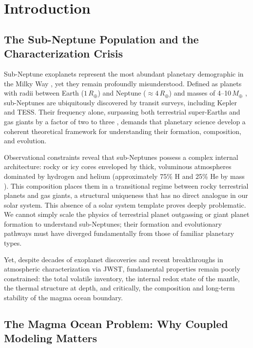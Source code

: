 \chapter{Introduction}\label{ch:introduction}

\section{The Sub-Neptune Population and the Characterization Crisis}

Sub-Neptune exoplanets represent the most abundant planetary demographic in the Milky Way
\cite{fulton2017}, yet they remain profoundly misunderstood. Defined as planets with radii
between Earth ($1\,R_\oplus$) and Neptune ($\approx 4\,R_\oplus$) and masses of
4--10\,$M_\oplus$ \cite{fulton2017}, sub-Neptunes are ubiquitously discovered by transit
surveys, including Kepler and TESS. Their frequency alone, surpassing both terrestrial
super-Earths and gas giants by a factor of two to three \cite{petigura2018}, demands that
planetary science develop a coherent theoretical framework for understanding their formation,
composition, and evolution.

Observational constraints reveal that sub-Neptunes possess a complex internal architecture:
rocky or icy cores enveloped by thick, voluminous atmospheres dominated by hydrogen and helium
(approximately 75\% H and 25\% He by mass \cite{madhusudhan2025}). This composition places
them in a transitional regime between rocky terrestrial planets and gas giants, a structural
uniqueness that has no direct analogue in our solar system. This absence of a solar system
template proves deeply problematic. We cannot simply scale the physics of terrestrial planet
outgassing or giant planet formation to understand sub-Neptunes; their formation and
evolutionary pathways must have diverged fundamentally from those of familiar planetary
types.

Yet, despite decades of exoplanet discoveries and recent breakthroughs in atmospheric
characterization via JWST, fundamental properties remain poorly constrained: the total
volatile inventory, the internal redox state of the mantle, the thermal structure at depth,
and critically, the composition and long-term stability of the magma ocean boundary.

\section{The Magma Ocean Problem: Why Coupled Modeling Matters}


